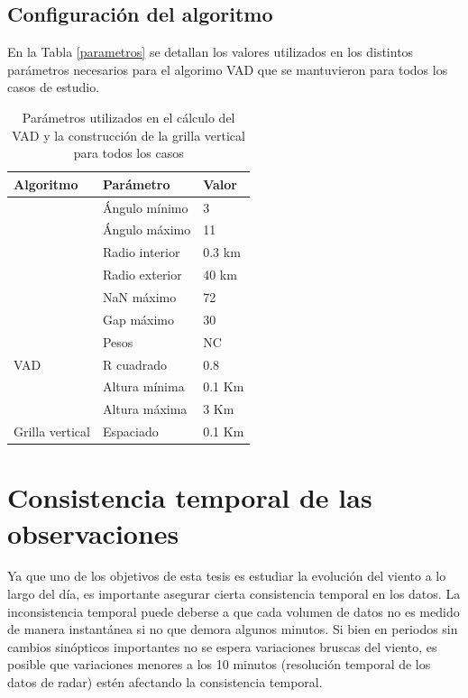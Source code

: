 \documentclass[12pt,spanish,oneside]{book}
\begin{document}
\subsection{Configuración del
algoritmo}\label{configuracion-del-algoritmo}

En la Tabla \ref{parametros} se detallan los valores utilizados en los
distintos parámetros necesarios para el algorimo VAD que se mantuvieron
para todos los casos de estudio.

\begin{table}

\caption{\label{tab:parametros}Parámetros utilizados en el cálculo del VAD y la construcción de la grilla vertical para todos los casos}
\centering
\begin{tabular}[t]{lll}
\toprule
Algoritmo & Parámetro & Valor\\
\midrule
 & Ángulo mínimo & 3\\
\cmidrule{2-3}
 & Ángulo máximo & 11\\
\cmidrule{2-3}
 & Radio interior & 0.3 km\\
\cmidrule{2-3}
 & Radio exterior & 40 km\\
\cmidrule{2-3}
 & NaN máximo & 72\\
\cmidrule{2-3}
 & Gap máximo & 30\\
\cmidrule{2-3}
 & Pesos & NC\\
\cmidrule{2-3}
\multirow{-8}{*}{\raggedright\arraybackslash VAD} & R cuadrado & 0.8\\
\cmidrule{1-3}
 & Altura mínima & 0.1 Km\\
\cmidrule{2-3}
 & Altura máxima & 3 Km\\
\cmidrule{2-3}
\multirow{-3}{*}{\raggedright\arraybackslash Grilla vertical} & Espaciado & 0.1 Km\\
\bottomrule
\end{tabular}
\end{table}

\section{Consistencia temporal de las
observaciones}\label{consistencia-temporal-de-las-observaciones}

Ya que uno de los objetivos de esta tesis es estudiar la evolución del
viento a lo largo del día, es importante asegurar cierta consistencia
temporal en los datos. La inconsistencia temporal puede deberse a que
cada volumen de datos no es medido de manera instantánea si no que
demora algunos minutos. Si bien en periodos sin cambios sinópticos
importantes no se espera variaciones bruscas del viento, es posible que
variaciones menores a los 10 minutos (resolución temporal de los datos
de radar) estén afectando la consistencia temporal.
\end{document}
